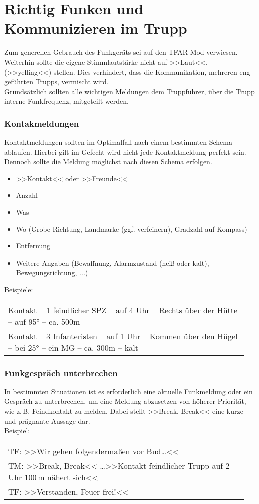 \section{Richtig Funken und Kommunizieren im Trupp}
	Zum generellen Gebrauch des Funkgeräts sei auf den TFAR-Mod verwiesen. Weiterhin sollte die eigene Stimmlautstärke nicht auf >>Laut<<, (>>yelling<<) stellen. Dies verhindert, dass die Kommunikation, mehreren eng geführten Trupps, vermischt wird.\\
	Grundsätzlich sollten alle wichtigen Meldungen dem Truppführer, über die Trupp interne Funkfrequenz, mitgeteilt werden.
 
\subsubsection{Kontakmeldungen}
	Kontaktmeldungen sollten im Optimalfall nach einem bestimmten Schema ablaufen. Hierbei gilt im Gefecht wird nicht jede Kontaktmeldung perfekt sein. Dennoch sollte die Meldung möglichst nach diesen Schema erfolgen.
	\begin{itemize}
		\setlength{\itemsep}{-4pt}
		\itemsep-4pt
		\item >>Kontakt<< oder >>Freunde<<
		\item Anzahl 
		\item Was
		\item Wo (Grobe Richtung, Landmarke (ggf. verfeinern), Gradzahl auf Kompass) 
		\item Entfernung
		\item Weitere Angaben (Bewaffnung, Alarmzustand (heiß oder kalt), Bewegungsrichtung, ...)
	\end{itemize}

	Beispiele:
	\begin{longtable}{P{0.95\linewidth}}
	\toprule
	Kontakt -- 1 feindlicher \acs{SPZ} -- auf 4 Uhr -- Rechts über der Hütte -- auf 95° -- ca. 500m\\
	\rcg Kontakt -- 3 Infanteristen -- auf 1 Uhr -- Kommen über den Hügel -- bei 25° -- ein \acs{MG} -- ca. 300m -- kalt\\
	\bottomrule
	\end{longtable}	
\subsubsection{Funkgespräch unterbrechen}
	In bestimmten Situationen ist es erforderlich eine aktuelle Funkmeldung oder ein Gespräch zu unterbrechen, um eine Meldung abzusetzen von höherer Priorität, wie z.\,B. Feindkontakt zu melden. Dabei stellt >>Break, Break<< eine kurze und prägnante Aussage dar.\\
	Beispiel:
	\begin{longtable}{P{0.95\linewidth}}
	\toprule
	TF: >>Wir gehen folgendermaßen vor Bud\dots<<\\
	\rcg TM: >>Break, Break<< \dots >>Kontakt feindlicher Trupp auf 2 Uhr 100\,m nähert sich<<\\
	TF: >>Verstanden, Feuer frei!<<\\
	\bottomrule
	\end{longtable}		

